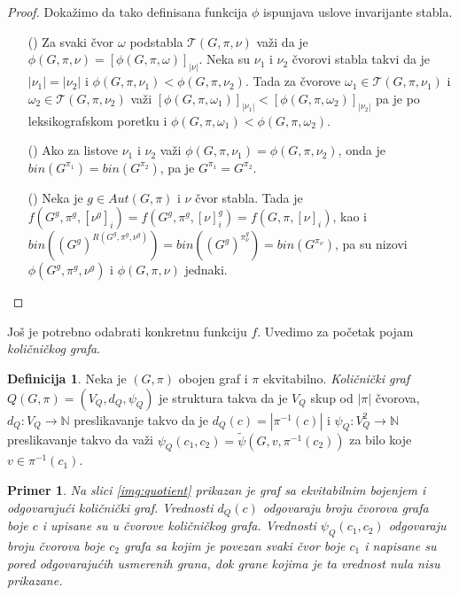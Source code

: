 \documentclass[12pt,oneside]{memoir}
\newtheorem{example}{Primer}
\theoremstyle{definition}
\newtheorem*{definition}{Definicija}
\begin{document}
  \begin{proof}
	  Dokažimo da tako definisana funkcija $\phi$ ispunjava uslove invarijante stabla.
	  \begin{itemize}
		  \item[(\phi1)] Za svaki čvor $\omega$ podstabla $\mathcal{T}(G, \pi,
			  \nu)$ važi da je $\phi(G, \pi, \nu) = [\phi(G, \pi,
			  \omega)]_{|\nu|}$. Neka su $\nu_1$ i $\nu_2$ čvorovi stabla takvi
			  da je $|\nu_1|=|\nu_2|$ i $\phi(G, \pi, \nu_1) < \phi(G, \pi,
			  \nu_2)$. Tada za čvorove $\omega_1 \in \mathcal{T}(G, \pi,
			  \nu_1)$ i $\omega_2 \in \mathcal{T}(G, \pi, \nu_2)$ važi
			  $[\phi(G, \pi, \omega_1)]_{|\nu_1|} < [\phi(G, \pi,
			  \omega_2)]_{|\nu_2|}$ pa je po leksikografskom poretku i $\phi(G,
			  \pi, \omega_1) < \phi(G, \pi, \omega_2)$.
		  \item[(\phi2)] Ako za listove $\nu_1$ i $\nu_2$ važi $\phi(G, \pi,
			  \nu_1) = \phi(G, \pi, \nu_2)$, onda je $bin(G^{\pi_1}) =
			  bin(G^{\pi_2})$, pa je $G^{\pi_1} = G^{\pi_2}$.
		  \item[(\phi3)] Neka je $g \in Aut(G, \pi)$ i $\nu$ čvor stabla. Tada
			  je $f(G^g, \pi^g, [\nu^g]_i) = f(G^g, \pi^g, [\nu]_i^g) = f(G,
			  \pi, [\nu]_i)$, kao i $bin((G^g)^{R(G^g, \pi^g, \nu^g)}) =
			  bin((G^g)^{\pi_\nu^g}) = bin(G^{\pi_\nu})$, pa su nizovi
			  $\phi(G^g, \pi^g, \nu^g)$ i $\phi(G, \pi, \nu)$ jednaki.
	  \end{itemize}
  \end{proof}

  Još je potrebno odabrati konkretnu funkciju $f$. Uvedimo za početak pojam
  \emph{količničkog grafa}.

  \begin{definition}
	  Neka je $(G, \pi)$ obojen graf i $\pi$ ekvitabilno. \emph{Količnički
	  graf} $Q(G, \pi) = (V_Q, d_Q, \psi_Q)$ je struktura takva da je $V_Q$
	  skup od $|\pi|$ čvorova, $d_Q : V_Q \to \mathbb{N}$ preslikavanje takvo
	  da je $d_Q(c) = |\pi^{-1}(c)|$ i $\psi_Q : V_Q^2 \to \mathbb{N}$
	  preslikavanje takvo da važi $\psi_Q(c_1, c_2) = \widetilde{\psi}(G, v,
	  \pi^{-1}(c_2))$ za bilo koje $v \in \pi^{-1}(c_1)$.
  \end{definition}

  \begin{example}
	  Na slici \ref{img:quotient} prikazan je graf sa ekvitabilnim bojenjem i
	  odgovarajući količnički graf. Vrednosti $d_Q(c)$ odgovaraju broju čvorova
	  grafa boje $c$ i upisane su u čvorove količničkog grafa.  Vrednosti
	  $\psi_Q(c_1, c_2)$ odgovaraju broju čvorova boje $c_2$ grafa sa kojim je
	  povezan svaki čvor boje $c_1$ i napisane su pored odgovarajućih usmerenih
	  grana, dok grane kojima je ta vrednost nula nisu prikazane.
  \end{example}
\end{document}
